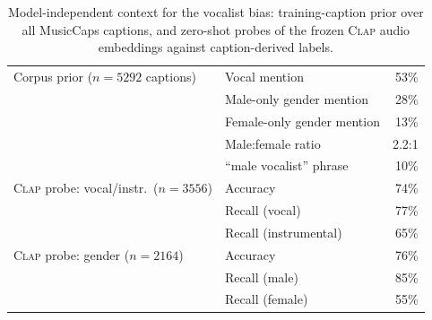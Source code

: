 \begin{table}[ht]
\centering
\caption{Model-independent context for the vocalist bias: training-caption prior over all MusicCaps captions, and zero-shot probes of the frozen \textsc{Clap} audio embeddings against caption-derived labels.}
\label{tab:vocal_bias_context}
\footnotesize
\begin{tabular}{llr}
\toprule
Corpus prior ($n=5292$ captions) & Vocal mention & 53\% \\
 & Male-only gender mention & 28\% \\
 & Female-only gender mention & 13\% \\
 & Male:female ratio & 2.2:1 \\
 & ``male vocalist'' phrase & 10\% \\
\midrule
\textsc{Clap} probe: vocal/instr.\ ($n=3556$) & Accuracy & 74\% \\
 & Recall (vocal) & 77\% \\
 & Recall (instrumental) & 65\% \\
\midrule
\textsc{Clap} probe: gender ($n=2164$) & Accuracy & 76\% \\
 & Recall (male) & 85\% \\
 & Recall (female) & 55\% \\
\bottomrule
\end{tabular}
\end{table}
